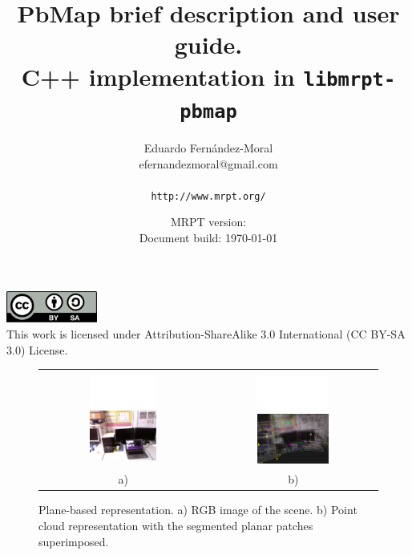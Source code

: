 \documentclass[a4paper,11pt]{article}
\title{PbMap brief description and user guide.\\C++ implementation in \texttt{libmrpt-pbmap}}
\author{Eduardo Fern\'andez-Moral \\ efernandezmoral@gmail.com \\
\\
\texttt{http://www.mrpt.org/} }
\date{MRPT version: \MRPTVERSION \\ Document build: \today }
\begin{document}
\maketitle


\vfill

\begin{scriptsize}
\begin{center}
\includegraphics[width=3cm]{../srba-guide/imgs/by-sa.pdf}
\\
This work is licensed under Attribution-ShareAlike 3.0 International (CC BY-SA 3.0) License.
\end{center}
\end{scriptsize}


\newpage
\tableofcontents
\newpage

\begin{figure}[t!]
    \begin{center}
    \begin{tabular}{cc}
		\includegraphics[width=0.42\textwidth]{imgs/scene.pdf} & \includegraphics[width=0.45\textwidth]{imgs/pbmap.pdf} \\
		\scriptsize a) & \scriptsize b) \\
    \end{tabular}
    \end{center}
    \caption{Plane-based representation. a) RGB image of the scene. b) Point cloud representation with the segmented planar patches superimposed.}
	\label{fig:pbmap}
\end{figure}
\end{document}
